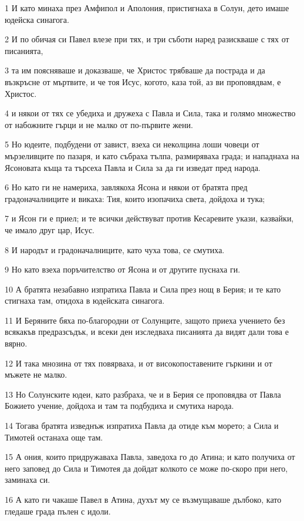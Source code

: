 \par 1 И като минаха през Амфипол и Аполония, пристигнаха в Солун, дето имаше юдейска синагога.
\par 2 И по обичая си Павел влезе при тях, и три съботи наред разискваше с тях от писанията,
\par 3 та им поясняваше и доказваше, че Христос трябваше да пострада и да възкръсне от мъртвите, и че тоя Исус, когото, каза той, аз ви проповядвам, е Христос.
\par 4 и някои от тях се убедиха и дружеха с Павла и Сила, така и голямо множество от набожните гърци и не малко от по-първите жени.
\par 5 Но юдеите, подбудени от завист, взеха си неколцина лоши човеци от мързеливците по пазаря, и като събраха тълпа, размиряваха града; и нападнаха на Ясоновата къща та търсеха Павла и Сила за да ги изведат пред народа.
\par 6 Но като ги не намериха, завлякоха Ясона и някои от братята пред градоначалниците и викаха: Тия, които изопачиха света, дойдоха и тука;
\par 7 и Ясон ги е приел; и те всички действуват против Кесаревите укази, казвайки, че имало друг цар, Исус.
\par 8 И народът и градоначалниците, като чуха това, се смутиха.
\par 9 Но като взеха поръчителство от Ясона и от другите пуснаха ги.
\par 10 А братята незабавно изпратиха Павла и Сила през нощ в Берия; и те като стигнаха там, отидоха в юдейската синагога.
\par 11 И Беряните бяха по-благородни от Солунците, защото приеха учението без всякакъв предразсъдък, и всеки ден изследваха писанията да видят дали това е вярно.
\par 12 И така мнозина от тях повярваха, и от високопоставените гъркини и от мъжете не малко.
\par 13 Но Солунските юдеи, като разбраха, че и в Берия се проповядва от Павла Божието учение, дойдоха и там та подбудиха и смутиха народа.
\par 14 Тогава братята изведнъж изпратиха Павла да отиде към морето; а Сила и Тимотей останаха още там.
\par 15 А ония, които придружаваха Павла, заведоха го до Атина; и като получиха от него заповед до Сила и Тимотея да дойдат колкото се може по-скоро при него, заминаха си.
\par 16 А като ги чакаше Павел в Атина, духът му се възмущаваше дълбоко, като гледаше града пълен с идоли.
